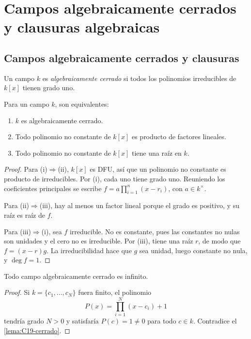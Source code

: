 \section{Campos algebraicamente cerrados y clausuras algebraicas}\label{sec:campos-clausuras}

\subsection{Campos algebraicamente cerrados y clausuras}\label{tema:19-2-2}\label{tema:24-1-1}
\begin{defi}
Un campo $k$ es \emph{algebraicamente cerrado} si todos los polinomios irreducibles de $k[x]$ tienen grado uno.
\end{defi}
\begin{lema}\label{lema:C19-cerrado}
Para un campo $k$, son equivalentes:
\begin{enumerate}[label=\textup{(\roman*)}]
\item $k$ es algebraicamente cerrado.
\item Todo polinomio no constante de $k[x]$ es producto de factores lineales.
\item Todo polinomio no constante de $k[x]$ tiene una raíz en $k$.
\end{enumerate}
\end{lema}
\begin{proof}
Para (i)$\Rightarrow$(ii), $k[x]$ es DFU, así que un polinomio no constante es producto de irreducibles. Por (i), cada uno tiene grado uno. Reuniendo los coeficientes principales se escribe $f=a\prod_{i=1}^n(x-r_i)$, con $a\in k^\times$.

Para (ii)$\Rightarrow$(iii), hay al menos un factor lineal porque el grado es positivo, y su raíz es raíz de $f$.

Para (iii)$\Rightarrow$(i), sea $f$ irreducible. No es constante, pues las constantes no nulas son unidades y el cero no es irreducible. Por (iii), tiene una raíz $r$, de modo que $f=(x-r)g$. La irreducibilidad hace que $g$ sea unidad, luego constante no nula, y $\deg f=1$.
\end{proof}

\begin{prop}\label{prop:C19-infinito}
Todo campo algebraicamente cerrado es infinito.
\end{prop}
\begin{proof}
Si $k=\{c_1,\ldots,c_N\}$ fuera finito, el polinomio
\[
P(x)=\prod_{i=1}^N(x-c_i)+1
\]
tendría grado $N>0$ y satisfaría $P(c)=1\ne0$ para todo $c\in k$. Contradice el \cref{lema:C19-cerrado}.
\end{proof}

